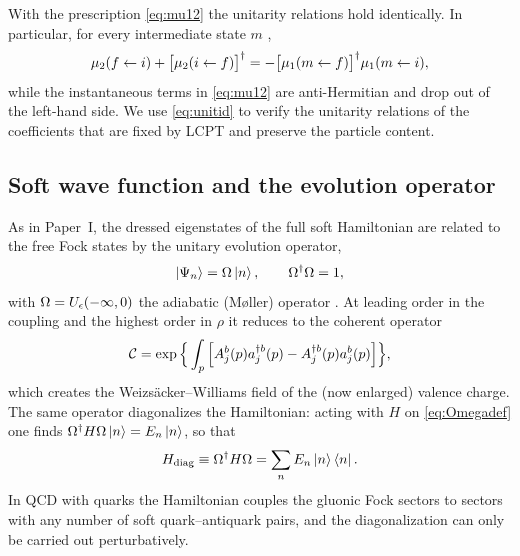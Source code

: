 With the prescription \eqref{eq:mu12} the unitarity relations hold identically. In particular,
for every intermediate state $m$ \cite{PaperI},
\begin{equation}
\mu_{2}(f\leftarrow i)+\big[\mu_{2}(i\leftarrow f)\big]^{\dagger}
=-\big[\mu_{1}(m\leftarrow f)\big]^{\dagger}\mu_{1}(m\leftarrow i),
\label{eq:unitid}
\end{equation}
while the instantaneous terms in \eqref{eq:mu12} are anti-Hermitian and drop out of the left-hand
side. We use \eqref{eq:unitid} to verify the unitarity relations of the coefficients that are
fixed by LCPT and preserve the particle content.

\subsection{Soft wave function and the evolution operator}
\label{sec:omegadef}

As in Paper~I, the dressed eigenstates of the full soft Hamiltonian are related to the free Fock
states by the unitary evolution operator,
\begin{equation}
\left|\Psi_{n}\right\rangle=\Omega\left|n\right\rangle,\qquad \Omega^{\dagger}\Omega=1,
\label{eq:Omegadef}
\end{equation}
with $\Omega=U_{\epsilon}(-\infty,0)$ the adiabatic (M{\o}ller) operator \cite{Kovner:2018fxj}. At
leading order in the coupling and the highest order in $\rho$ it reduces to the coherent operator
\begin{equation}
\mathcal C=\exp\Big\{\int_{p}\Big[A^{b}_{j}(p)a^{\dagger b}_{j}(p)-A^{\dagger b}_{j}(p)a^{b}_{j}(p)\Big]\Big\},
\label{eq:coherent}
\end{equation}
which creates the Weizs\"acker--Williams field of the (now enlarged) valence charge. The same
operator diagonalizes the Hamiltonian: acting with $H$ on \eqref{eq:Omegadef} one finds
$\Omega^{\dagger}H\Omega\left|n\right\rangle=E_{n}\left|n\right\rangle$, so that
\begin{equation}
H_{\rm diag}\equiv\Omega^{\dagger}H\Omega=\sum_{n}E_{n}\left|n\right\rangle\left\langle n\right|.
\label{eq:Hdiag}
\end{equation}
In QCD with quarks the Hamiltonian couples the gluonic Fock sectors to sectors with any number of
soft quark--antiquark pairs, and the diagonalization can only be carried out perturbatively.
